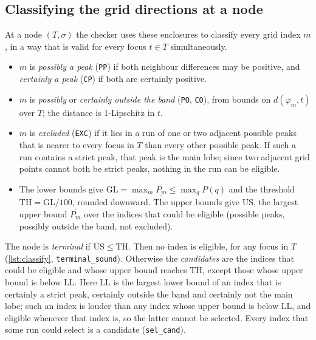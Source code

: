 \documentclass[11pt]{amsart}
\theoremstyle{plain}
\theoremstyle{definition}
\newcommand{\thy}[1]{\texttt{#1}}
\newcommand{\dist}{d}
\begin{document}
\subsection{Classifying the grid directions at a node}\label{sec:classify}

At a node $(T, \sigma)$ the checker uses these enclosures to classify every grid index $m$, in a way
that is valid for every focus $t \in T$ simultaneously.
\begin{itemize}
\item $m$ is \emph{possibly a peak} (\thy{PP}) if both neighbour differences may be positive, and
\emph{certainly a peak} (\thy{CP}) if both are certainly positive.
\item $m$ is \emph{possibly} or \emph{certainly outside the band} (\thy{PO}, \thy{CO}), from bounds on
$\dist(\varphi_m, t)$ over $T$; the distance is 1-Lipschitz in $t$.
\item $m$ is \emph{excluded} (\thy{EXC}) if it lies in a run of one or two adjacent possible peaks that
is nearer to every focus in $T$ than every other possible peak.  If such a run contains a strict peak,
that peak is the main lobe; since two adjacent grid points cannot both be strict peaks, nothing in the
run can be eligible.
\item The lower bounds give $\mathrm{GL} = \max_m \underline{P_m} \le \max_q P(q)$ and the threshold
$\mathrm{TH} = \mathrm{GL}/100$, rounded downward.  The upper bounds give $\mathrm{US}$, the largest
upper bound $\overline{P_m}$ over the indices that could be eligible (possible peaks, possibly outside
the band, not excluded).
\end{itemize}
The node is \emph{terminal} if $\mathrm{US} \le \mathrm{TH}$.  Then no index is eligible, for any focus
in $T$ (\cref{lst:classify}, \thy{terminal\_sound}).  Otherwise the \emph{candidates} are the indices
that could be eligible and whose upper bound reaches $\mathrm{TH}$, except those whose upper bound is
below $\mathrm{LL}$.  Here $\mathrm{LL}$ is the largest lower bound of an index that is certainly a
strict peak, certainly outside the band and certainly not the main lobe; such an index is louder than
any index whose upper bound is below $\mathrm{LL}$, and eligible whenever that index is, so the latter
cannot be selected.  Every index that some run could select is a candidate
(\thy{sel\_cand}).




\end{document}
